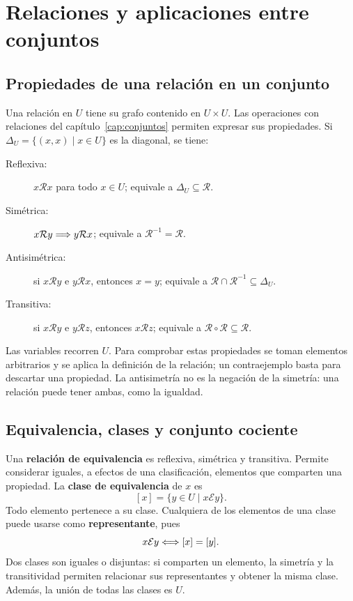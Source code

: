 \chapter{Relaciones y aplicaciones entre conjuntos}
\label{cap:relaciones-aplicaciones}

\section{Propiedades de una relación en un conjunto}
\label{sec:propiedades-relaciones}

Una relación en $U$ tiene su grafo contenido en $U\times U$.
Las operaciones con relaciones del capítulo~\ref{cap:conjuntos}
permiten expresar sus propiedades. Si
$\Delta_U=\{(x,x)\mid x\in U\}$ es la diagonal, se tiene:
\begin{description}
 \item[Reflexiva:] $x\mathcal R x$ para todo $x\in U$;
       equivale a $\Delta_U\subseteq\mathcal R$.
 \item[Simétrica:] $x\mathcal R y\Longrightarrow y\mathcal R x$;
       equivale a $\mathcal R^{-1}=\mathcal R$.
 \item[Antisimétrica:] si $x\mathcal R y$ e $y\mathcal R x$, entonces $x=y$;
       equivale a $\mathcal R\cap\mathcal R^{-1}\subseteq\Delta_U$.
 \item[Transitiva:] si $x\mathcal R y$ e $y\mathcal R z$, entonces
       $x\mathcal R z$; equivale a
       $\mathcal R\circ\mathcal R\subseteq\mathcal R$.
\end{description}
Las variables recorren $U$. Para comprobar estas propiedades se toman
elementos arbitrarios y se aplica la definición de la relación;
un contraejemplo basta para descartar una propiedad.
La antisimetría no es la negación de la simetría: una relación puede
tener ambas, como la igualdad.

\section{Equivalencia, clases y conjunto cociente}
\label{sec:equivalencia}

Una \textbf{relación de equivalencia} es reflexiva, simétrica y transitiva.
Permite considerar iguales, a efectos de una clasificación, elementos
que comparten una propiedad. La \textbf{clase de equivalencia} de $x$ es
\[
 [x]=\{y\in U\mid x\mathcal E y\}.
\]
Todo elemento pertenece a su clase. Cualquiera de los elementos de una
clase puede usarse como \textbf{representante}, pues
\[
 x\mathcal E y\Longleftrightarrow[x]=[y].
\]
Dos clases son iguales o disjuntas: si comparten un elemento, la simetría
y la transitividad permiten relacionar sus representantes y obtener
la misma clase. Además, la unión de todas las clases es $U$.

